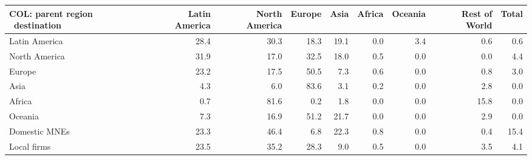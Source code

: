 \begin{tabular}{lrrrrrrrr}
\toprule
COL: parent region \ destination & Latin America & North America & Europe & Asia & Africa & Oceania & Rest of World & Total \\
\midrule
Latin America & 28.4 & 30.3 & 18.3 & 19.1 & 0.0 & 3.4 & 0.6 & 0.6 \\
North America & 31.9 & 17.0 & 32.5 & 18.0 & 0.5 & 0.0 & 0.0 & 4.4 \\
Europe & 23.2 & 17.5 & 50.5 & 7.3 & 0.6 & 0.0 & 0.8 & 3.0 \\
Asia & 4.3 & 6.0 & 83.6 & 3.1 & 0.2 & 0.0 & 2.8 & 0.0 \\
Africa & 0.7 & 81.6 & 0.2 & 1.8 & 0.0 & 0.0 & 15.8 & 0.0 \\
Oceania & 7.3 & 16.9 & 51.2 & 21.7 & 0.0 & 0.0 & 2.9 & 0.0 \\
Domestic MNEs & 23.3 & 46.4 & 6.8 & 22.3 & 0.8 & 0.0 & 0.4 & 15.4 \\
Local firms & 23.5 & 35.2 & 28.3 & 9.0 & 0.5 & 0.0 & 3.5 & 4.1 \\
\bottomrule
\end{tabular}
